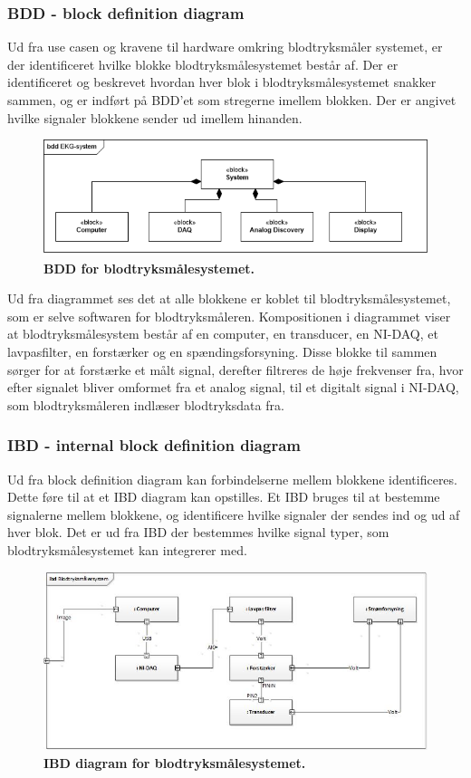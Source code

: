 \subsubsection{BDD - block definition diagram}
Ud fra use casen og kravene til hardware omkring blodtryksmåler systemet, er der identificeret hvilke blokke blodtryksmålesystemet består af. Der er identificeret og beskrevet hvordan hver blok i blodtryksmålesystemet snakker sammen, og er indført på BDD’et som stregerne imellem blokken. Der er angivet hvilke signaler blokkene sender ud imellem hinanden.  
\begin{figure}[H]
\includegraphics[width =1.0\textwidth , center]{billeder/BDD}
\caption{\textbf{BDD for blodtryksmålesystemet.}}
\end{figure}
Ud fra diagrammet ses det at alle blokkene er koblet til blodtryksmålesystemet, som er selve softwaren for blodtryksmåleren. Kompositionen i diagrammet viser at blodtryksmålesystem består af en computer, en transducer, en NI-DAQ, et lavpasfilter, en forstærker og en spændingsforsyning. Disse blokke til sammen sørger for at forstærke et målt signal, derefter filtreres de høje frekvenser fra, hvor efter signalet bliver omformet fra et analog signal, til et digitalt signal i NI-DAQ, som blodtryksmåleren indlæser blodtryksdata fra. 
\subsubsection{IBD - internal block definition diagram}
Ud fra block definition diagram kan forbindelserne mellem blokkene identificeres. Dette føre til at et IBD diagram kan opstilles. Et IBD bruges til at bestemme signalerne mellem blokkene, og identificere hvilke signaler der sendes ind og ud af hver blok. Det er ud fra IBD der bestemmes hvilke signal typer, som blodtryksmålesystemet kan integrerer med.
\begin{figure}[H]
\includegraphics[width =1.0\textwidth , center]{billeder/IBD}
\caption{\textbf{IBD diagram for blodtryksmålesystemet.}}
\end{figure}

